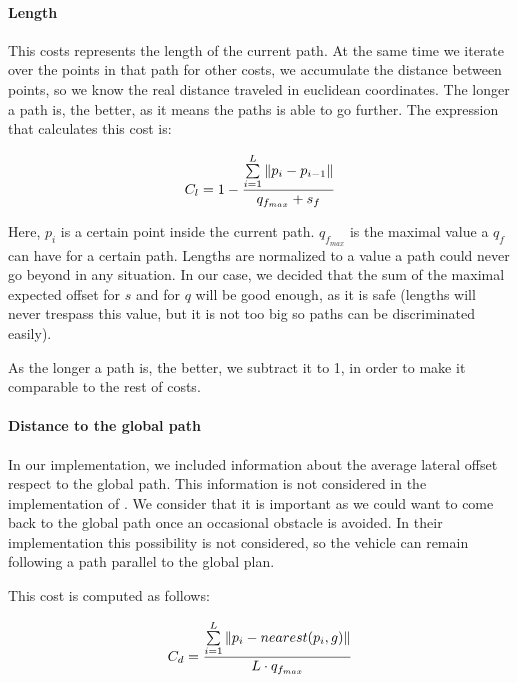 \paragraph{Length}\label{ch:chapter07_01_04_00_02}

This costs represents the length of the current path. At the same time we iterate over the points in that path for other costs, we accumulate the distance between points, so we know the real distance traveled in euclidean coordinates. The longer a path is, the better, as it means the paths is able to go further. The expression that calculates this cost is:

\begin{equation}\label{eq:cp07_length_cost}
C_l = 1- {{\sum\limits_{i=1}^{L}\|p_i - p_{i - 1}\|} \over {q_{f_{max}} + s_f}}
\end{equation}

Here, $p_i$ is a certain point inside the current path. $q_{f_{max}}$ is the maximal value a $q_f$ can have for a certain path. Lengths are normalized to a value a path could never go beyond in any situation. In our case, we decided that the sum of the maximal expected offset for $s$ and for $q$ will be good enough, as it is safe (lengths will never trespass this value, but it is not too big so paths can be discriminated easily).

As the longer a path is, the better, we subtract it to 1, in order to make it comparable to the rest of costs.

\paragraph{Distance to the global path}\label{ch:chapter07_01_04_00_03}

In our implementation, we included information about the average lateral offset respect to the global path. This information is not considered in the implementation of \cite{chu2012local}. We consider that it is important as we could want to come back to the global path once an occasional obstacle is avoided. In their implementation this possibility is not considered, so the vehicle can remain following a path parallel to the global plan.

This cost is computed as follows:

\begin{equation}\label{eq:cp07_lateral_cost}
C_d = {{\sum\limits_{i=1}^{L}\|p_i - nearest(p_i, g)\|} \over {L \cdot q_{f_{max}}}}
\end{equation}

